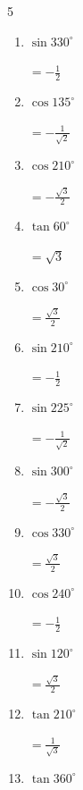 \begin{multicols}{5}
\begin{enumerate}
  \item $\displaystyle \sin{330^\circ}$

        $\displaystyle =-\frac{1}{2}$

\columnbreak %

  \item $\displaystyle \cos{135^\circ}$

        $\displaystyle =-\frac{1}{\sqrt{2}}$

  \item $\displaystyle \cos{210^\circ}$

        $\displaystyle =-\frac{\sqrt{3}}{2}$

  \item $\displaystyle \tan{60^\circ}$

        $\displaystyle =\sqrt{3}$

  \item $\displaystyle \cos{30^\circ}$

        $\displaystyle =\frac{\sqrt{3}}{2}$

  \item $\displaystyle \sin{210^\circ}$

        $\displaystyle =-\frac{1}{2}$

  \item $\displaystyle \sin{225^\circ}$

        $\displaystyle =-\frac{1}{\sqrt{2}}$

  \item $\displaystyle \sin{300^\circ}$

        $\displaystyle =-\frac{\sqrt{3}}{2}$

  \item $\displaystyle \cos{330^\circ}$

        $\displaystyle =\frac{\sqrt{3}}{2}$

  \item $\displaystyle \cos{240^\circ}$

        $\displaystyle =-\frac{1}{2}$

  \item $\displaystyle \sin{120^\circ}$

        $\displaystyle =\frac{\sqrt{3}}{2}$

  \item $\displaystyle \tan{210^\circ}$

        $\displaystyle =\frac{1}{\sqrt{3}}$

  \item $\displaystyle \tan{360^\circ}$


\end{enumerate}
\end{multicols}
